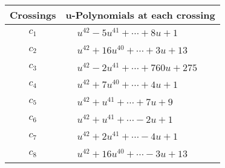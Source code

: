 \documentclass[1p]{elsarticle_modified}
\theoremstyle{definition}
\begin{document}
\begin{tabular}{m{50pt}|m{274pt}}
Crossings & \hspace{64pt}u-Polynomials at each crossing \\
\hline $$\begin{aligned}c_{1}\end{aligned}$$&$\begin{aligned}
&u^{42}-5 u^{41}+\cdots+8 u+1
\end{aligned}$\\
\hline $$\begin{aligned}c_{2}\end{aligned}$$&$\begin{aligned}
&u^{42}+16 u^{40}+\cdots+3 u+13
\end{aligned}$\\
\hline $$\begin{aligned}c_{3}\end{aligned}$$&$\begin{aligned}
&u^{42}-2 u^{41}+\cdots+760 u+275
\end{aligned}$\\
\hline $$\begin{aligned}c_{4}\end{aligned}$$&$\begin{aligned}
&u^{42}+7 u^{40}+\cdots+4 u+1
\end{aligned}$\\
\hline $$\begin{aligned}c_{5}\end{aligned}$$&$\begin{aligned}
&u^{42}+u^{41}+\cdots+7 u+9
\end{aligned}$\\
\hline $$\begin{aligned}c_{6}\end{aligned}$$&$\begin{aligned}
&u^{42}+u^{41}+\cdots-2 u+1
\end{aligned}$\\
\hline $$\begin{aligned}c_{7}\end{aligned}$$&$\begin{aligned}
&u^{42}+2 u^{41}+\cdots-4 u+1
\end{aligned}$\\
\hline $$\begin{aligned}c_{8}\end{aligned}$$&$\begin{aligned}
&u^{42}+16 u^{40}+\cdots-3 u+13
\end{aligned}$\\

\end{tabular}
\end{document}
